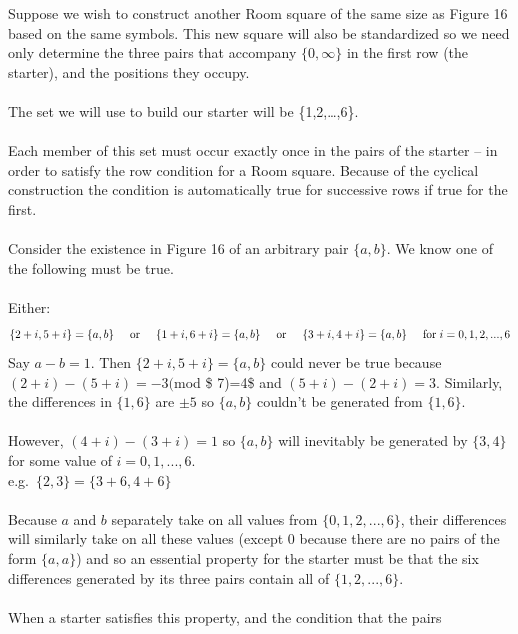 \documentclass[
  12pt,
  a4paper]{book}
\begin{document}
Suppose we wish to construct another Room square of the same size as
Figure 16 based on the same symbols. This new square will also be
standardized so we need only determine the three pairs that accompany
\(\{0,\infty\}\) in the first row (the starter), and the positions they
occupy.\\
~\\
The set we will use to build our starter will be \{1,2,\ldots,6\}.\\
~\\
Each member of this set must occur exactly once in the pairs of the
starter -- in order to satisfy the row condition for a Room square.
Because of the cyclical construction the condition is automatically true
for successive rows if true for the first.\\
~\\
Consider the existence in Figure 16 of an arbitrary pair \(\{a,b\}\). We
know one of the following must be true.\\
~\\
Either:
\[\{2+i,5+i\}=\{a,b\} \hspace{0.5cm} \mathrm{or} \hspace{0.5cm} \{1+i,6+i\}=\{a,b\} \hspace{0.5cm} 
\mathrm{or} \hspace{0.5cm} \{3+i,4+i\}=\{a,b\} \hspace{0.5cm} \mathrm{for} \hspace{0.1cm} i=0,1,2,...,6\]
Say \(a-b=1\). Then \(\{2+i,5+i\}=\{a,b\}\) could never be true because
\((2+i)-(5+i)=-3(\)mod \$ 7)=4\$ and \((5+i)-(2+i)=3\). Similarly, the
differences in \(\{1,6\}\) are \(\pm5\) so \(\{a,b\}\) couldn't be generated
from \(\{1,6\}\).\\
~\\
However, \((4+i)-(3+i)=1\) so \(\{a,b\}\) will inevitably be generated by
\(\{3,4\}\) for some value of \(i=0,1,...,6\).\\
e.g.~\(\{2,3\}=\{3+6,4+6\}\)\\
~\\
Because \(a\) and \(b\) separately take on all values from
\(\{0,1,2,...,6\}\), their differences will similarly take on all these
values (except 0 because there are no pairs of the form \(\{a,a\}\)) and
so an essential property for the starter must be that the six
differences generated by its three pairs contain all of
\(\{1,2,...,6\}\).\\
~\\
When a starter satisfies this property, and the condition that the pairs
\end{document}
